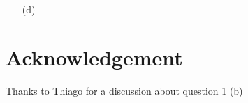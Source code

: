 \documentclass[10pt, a4paper]{article}
\begin{document}
{\begin{enumerate}
\begin{align*}
    &= \sum_{\Delta'} \delta_{\Delta', \Delta_3} \sum_l \beta^{\Delta', |l|}_{\Delta_1, \Delta_2} |x_{12}|^{-\Delta_1 - \Delta_2+\Delta'} (x_{12})^{l} \partial_{l} \frac{1}{|x_{23}|^{2 \Delta_3}}\\
    &= \frac{1}{|x_{12}|^{\Delta_1 + \Delta_2 - \Delta_3}}\sum_l \beta^{\Delta_3, |l|}_{\Delta_1, \Delta_2}  (x_{12})^{l} \frac{\partial}{\partial x^l_2} \frac{1}{|x_{23}|^{2 \Delta_3}}, \quad \text{supposing only one primary operator for each $\Delta_3$}. 
  \end{align*}
  Comparing this result with the first expression given for the three-point function, we get 
  \begin{align*}
    \frac{C_{123}}{|x_{12}|^{\Delta_1+\Delta_2-\Delta_3} |x_{23}|^{\Delta_2+\Delta_3-\Delta_1} |x_{31}|^{\Delta_3+\Delta_1-\Delta_2}}
    &= \frac{1}{|x_{12}|^{\Delta_1 + \Delta_2 - \Delta_3}}\sum_l \beta^{\Delta_3, l}_{\Delta_1, \Delta_2}  (x_{12})^{l} \partial_{l} \frac{1}{|x_{13}-x_{12}|^{2 \Delta_3}}. \\
    &\iff \frac{C_{123}}{|x_{23}|^{\Delta_2+\Delta_3-\Delta_1} |x_{31}|^{\Delta_3+\Delta_1-\Delta_2}} =  \sum_l \beta^{\Delta_3, l}_{\Delta_1, \Delta_2}  (x_{12})^{l} \partial_{l} \frac{1}{|x_{13}-x_{12}|^{2 \Delta_3}}
  \end{align*}


  \item[(d)] 
\end{enumerate}


\section{Acknowledgement}

Thanks to Thiago for a discussion about question 1 (b)

}



\end{document}
